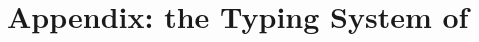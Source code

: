 \documentclass[runningheads]{llncs}
\begin{document}

%

{}


\newpage
\onecolumn
\setcounter{tocdepth}{4}
\tableofcontents

\appendix 
\section{Appendix: the Typing System of \HOp}
\label{app:types}

%



\end{document}

